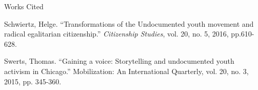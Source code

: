 \documentclass[12pt]{article}
\newcommand{\bibent}{\noindent \hangindent 40pt}
\newenvironment{workscited}{\newpage \begin{center} Works Cited \end{center}}{\newpage }
\begin{document}
\begin{flushleft}
\begin{workscited}

\bibent
Schwiertz, Helge. ``Transformations of the Undocumented youth movement and radical egalitarian citizenship.'' \textit{Citizenship Studies}, vol. 20, no. 5, 2016, pp.610-628.

\bibent
Swerts, Thomas. “Gaining a voice: Storytelling and undocumented youth activism in Chicago.” Mobilization: An International Quarterly, vol. 20, no. 3, 2015, pp. 345-360.



\end{workscited}

\end{flushleft}
\end{document}
